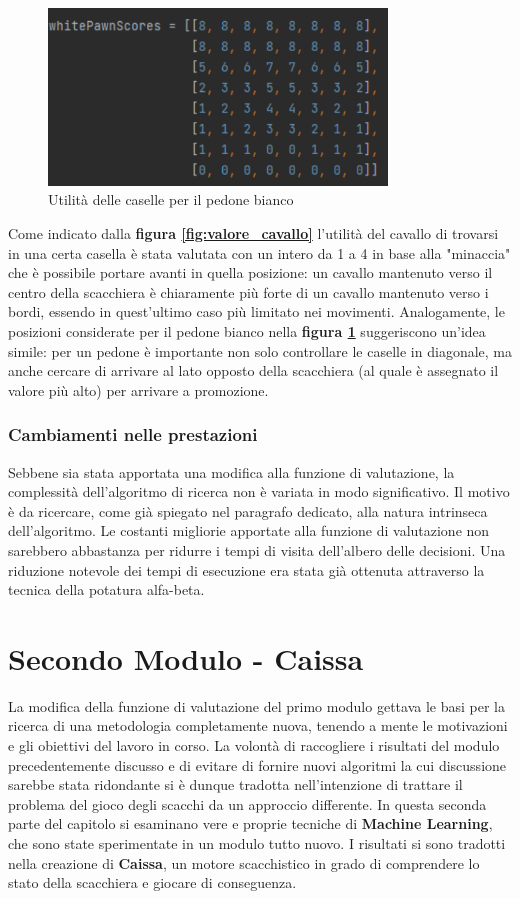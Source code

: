 \begin{figure}[!htb]
    \includegraphics[width=9cm]{frontmatter/figure/pedone.pdf}
    \centering
    \caption{Utilità delle caselle per il pedone bianco}
    \label{fig:valore_pedoni}
\end{figure}
\newpage
Come indicato dalla \textbf{figura \ref{fig:valore_cavallo}} l'utilità del cavallo di trovarsi in una certa casella è stata valutata con un intero da 1 a 4 in base alla "minaccia" che è possibile portare avanti in quella posizione: un cavallo mantenuto verso il centro della scacchiera è chiaramente più forte di un cavallo mantenuto verso i bordi, essendo in quest'ultimo caso più limitato nei movimenti. Analogamente, le posizioni considerate per il pedone bianco nella \textbf{figura \ref{fig:valore_pedoni}} suggeriscono un'idea simile: per un pedone è importante non solo controllare le caselle in diagonale, ma anche cercare di arrivare al lato opposto della scacchiera (al quale è assegnato il valore più alto) per arrivare a promozione. 

\subsubsection{Cambiamenti nelle prestazioni}
Sebbene sia stata apportata una modifica alla funzione di valutazione, la complessità dell'algoritmo di ricerca non è variata in modo significativo. Il motivo è da ricercare, come già spiegato nel paragrafo dedicato, alla natura intrinseca dell'algoritmo. Le costanti migliorie apportate alla funzione di valutazione non sarebbero abbastanza per ridurre i tempi di visita dell'albero delle decisioni. Una riduzione notevole dei tempi di esecuzione era stata già ottenuta attraverso la tecnica della potatura alfa-beta.

\section{Secondo Modulo - Caissa}
La modifica della funzione di valutazione del primo modulo gettava le basi per la ricerca di una metodologia completamente nuova, tenendo a mente le motivazioni e gli obiettivi del lavoro in corso. La volontà di raccogliere i risultati del modulo precedentemente discusso e di evitare di fornire nuovi algoritmi la cui discussione sarebbe stata ridondante si è dunque tradotta nell'intenzione di trattare il problema del gioco degli scacchi da un approccio differente. In questa seconda parte del capitolo si esaminano vere e proprie tecniche di \textbf{Machine Learning}, che sono state sperimentate in un modulo tutto nuovo. I risultati si sono tradotti nella creazione di \textbf{Caissa}, un motore scacchistico in grado di comprendere lo stato della scacchiera e giocare di conseguenza.
\newpage
